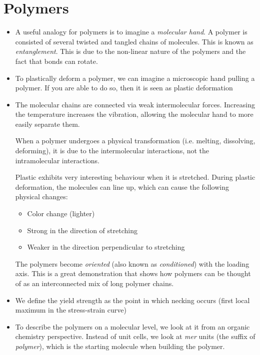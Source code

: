 \section{Polymers}
\begin{itemize}
    \item A useful analogy for polymers is to imagine a \textit{molecular hand}. A polymer is consisted of several twisted and tangled chains of molecules. This is known as \textit{entanglement}. This is due to the non-linear nature of the polymers and the fact that bonds can rotate.
    \item To plastically deform a polymer, we can imagine a microscopic hand pulling a polymer. If you are able to do so, then it is seen as plastic deformation
    \item The molecular chains are connected via weak intermolecular forces. Increasing the temperature increases the vibration, allowing the molecular hand to more easily separate them.
    \begin{idea}
        When a polymer undergoes a physical transformation (i.e. melting, dissolving, deforming), it is due to the intermolecular interactions, not the intramolecular interactions. 
    \end{idea}
    \begin{case}
        Plastic exhibits very interesting behaviour when it is stretched. During plastic deformation, the molecules can line up, which can cause the following physical changes:
        \begin{itemize}
            \item Color change (lighter)
            \item Strong in the direction of stretching
            \item Weaker in the direction perpendicular to stretching
        \end{itemize}
        The polymers become \textit{oriented} (also known as \textit{conditioned}) with the loading axis. This is a great demonstration that shows how polymers can be thought of as an interconnected mix of long polymer chains.
    \end{case}
    \item We define the yield strength as the point in which necking occurs (first local maximum in the stress-strain curve)
    \item To describe the polymers on a molecular level, we look at it from an organic chemistry perspective. Instead of unit cells, we look at \textit{mer} units (the suffix of \textit{polymer}), which is the starting molecule when building the polymer.

\end{itemize}
